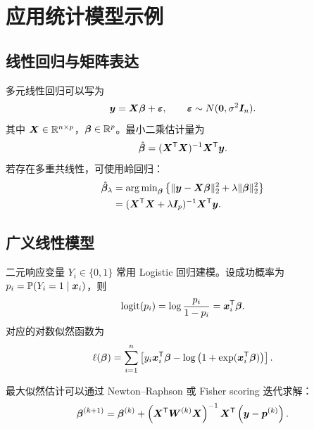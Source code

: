 \section{应用统计模型示例}

\subsection{线性回归与矩阵表达}

多元线性回归可以写为
\begin{equation}
  \bm{y}=\bm{X}\bm{\beta}+\bm{\varepsilon},\qquad
  \bm{\varepsilon}\sim N(\bm{0},\sigma^2\bm{I}_n).
\end{equation}
其中 \(\bm{X}\in\mathbb{R}^{n\times p}\)，\(\bm{\beta}\in\mathbb{R}^{p}\)。最小二乘估计量为
\begin{equation}
  \hat{\bm{\beta}}
  =(\bm{X}^{\mathsf T}\bm{X})^{-1}\bm{X}^{\mathsf T}\bm{y}.
\end{equation}
若存在多重共线性，可使用岭回归：
\begin{align}
  \hat{\bm{\beta}}_{\lambda}
  &=\operatorname{arg\,min}_{\bm{\beta}}\left\{
    \lVert \bm{y}-\bm{X}\bm{\beta}\rVert_2^2
    +\lambda\lVert\bm{\beta}\rVert_2^2
  \right\} \notag\\
  &=(\bm{X}^{\mathsf T}\bm{X}+\lambda\bm{I}_p)^{-1}
    \bm{X}^{\mathsf T}\bm{y}.
  \label{eq:ridge}
\end{align}

\subsection{广义线性模型}

二元响应变量 \(Y_i\in\{0,1\}\) 常用 Logistic 回归建模。设成功概率为 \(p_i=\mathbb{P}(Y_i=1\mid \bm{x}_i)\)，则
\begin{equation}
  \operatorname{logit}(p_i)=\log\frac{p_i}{1-p_i}=\bm{x}_i^{\mathsf T}\bm{\beta}.
\end{equation}
对应的对数似然函数为
\begin{equation}
  \ell(\bm{\beta})
  =\sum_{i=1}^{n}\left[
    y_i\bm{x}_i^{\mathsf T}\bm{\beta}
    -\log\left(1+\exp(\bm{x}_i^{\mathsf T}\bm{\beta})\right)
  \right].
  \label{eq:logit-likelihood}
\end{equation}

最大似然估计可以通过 Newton--Raphson 或 Fisher scoring 迭代求解：
\begin{equation}
  \bm{\beta}^{(k+1)}
  =\bm{\beta}^{(k)}
  +\left(\bm{X}^{\mathsf T}\bm{W}^{(k)}\bm{X}\right)^{-1}
   \bm{X}^{\mathsf T}\left(\bm{y}-\bm{p}^{(k)}\right).
\end{equation}

